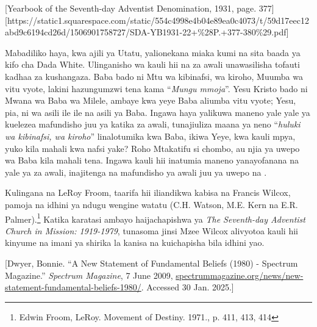 [Yearbook of the Seventh-day Adventist Denomination, 1931, page. 377][https://static1.squarespace.com/static/554c4998e4b04e89ea0c4073/t/59d17eec12abd9c6194cd26d/1506901758727/SDA-YB1931-22+\%28P.+377-380\%29.pdf]

Mabadiliko haya, kwa ajili ya Utatu, yalionekana miaka kumi na sita baada ya kifo cha Dada White. Ulinganisho wa kauli hii na  za awali unawasilisha tofauti kadhaa za kushangaza. Baba bado ni Mtu wa kibinafsi, wa kiroho, Muumba wa vitu vyote, lakini hazungumzwi tena kama “\textit{Mungu mmoja}”. Yesu Kristo bado ni Mwana wa Baba wa Milele, ambaye kwa yeye Baba aliumba vitu vyote; Yesu, pia, ni wa asili ile ile na asili ya Baba. Ingawa haya yalikuwa maneno yale yale ya kuelezea mafundisho juu ya  katika  za awali, tunajiuliza maana ya neno “\textit{huluki wa kibinafsi, wa kiroho}” linalotumika kwa Baba, ikiwa Yeye, kwa kauli mpya, yuko kila mahali kwa nafsi yake? Roho Mtakatifu si chombo, au njia ya uwepo wa Baba kila mahali tena. Ingawa kauli hii inatumia maneno yanayofanana na yale ya  za awali, inajitenga na mafundisho ya awali juu ya uwepo na .

Kulingana na LeRoy Froom, taarifa hii iliandikwa kabisa na Francis Wilcox, pamoja na idhini ya ndugu wengine watatu (C.H. Watson, M.E. Kern na E.R. Palmer).\footnote{Edwin Froom, LeRoy. Movement of Destiny. 1971., p. 411, 413, 414} Katika karatasi ambayo haijachapishwa ya \textit{The Seventh-day Adventist Church in Mission: 1919-1979}, tunasoma jinsi Mzee Wilcox alivyotoa kauli hii kinyume na imani ya shirika la kanisa na kuichapisha bila idhini yao.

[Dwyer, Bonnie. “A New Statement of Fundamental Beliefs (1980) - Spectrum Magazine.” \textit{Spectrum Magazine}, 7 June 2009, \href{https://spectrummagazine.org/news/new-statement-fundamental-beliefs-1980/}{spectrummagazine.org/news/new-statement-fundamental-beliefs-1980/}. Accessed 30 Jan. 2025.]

